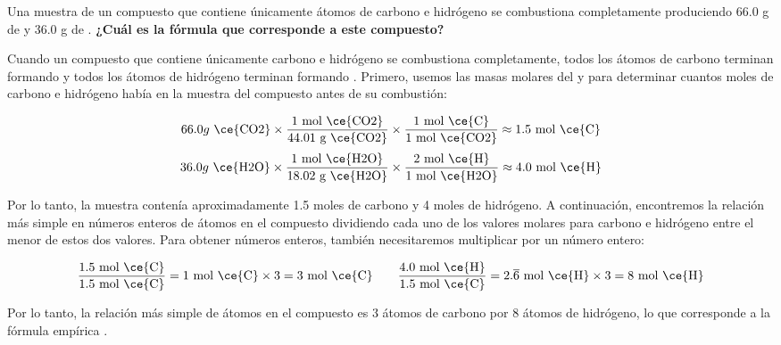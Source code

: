 Una muestra de un compuesto que contiene únicamente átomos de carbono e hidrógeno se combustiona completamente produciendo 66.0 g de  y 36.0 g de .
\textbf{¿Cuál es la fórmula que corresponde a este compuesto?}

\begin{oneparchoices}
    \choice  {}
    \CorrectChoice  {}
    \choice  {}
    \choice  {}
\end{oneparchoices}

\begin{solutionbox}{8.5cm}
    Cuando un compuesto que contiene únicamente carbono e hidrógeno se combustiona completamente, todos los átomos de carbono terminan formando  y todos los átomos de hidrógeno terminan formando .
    Primero, usemos las masas molares del  y  para determinar cuantos moles de carbono e hidrógeno había en la muestra del compuesto antes de su combustión:
    
    \[ 66.0 g \text{ \ce{CO2}} \times \frac{1 \text{ mol \ce{CO2}}}{44.01 \text{ g \ce{CO2}}} \times \dfrac{ 1 \text{ mol \ce{C}}}{1 \text{ mol \ce{CO2}}} \approx 1.5 \text{ mol \ce{C}}  \]
    \[ 36.0 g \text{ \ce{H2O}} \times \frac{1 \text{ mol \ce{H2O}}}{18.02 \text{ g \ce{H2O}}}  \times \dfrac{ 2 \text{ mol \ce{H}}}{1 \text{ mol \ce{H2O}}} \approx 4.0 \text{ mol \ce{H}}  \]
    
    Por lo tanto, la muestra contenía aproximadamente  1.5 moles de carbono y 4 moles de hidrógeno.
    A continuación, encontremos la relación más simple en números enteros de átomos en el compuesto dividiendo cada uno de los valores molares para carbono e hidrógeno entre el menor de estos dos valores. Para obtener números enteros, también necesitaremos multiplicar por un número entero:
    
    \[ \frac{1.5 \text{ mol \ce{C}}}{1.5 \text{ mol \ce{C}}} = 1 \text{ mol \ce{C}} \times 3 = 3 \text{ mol \ce{C}} \qquad \frac{4.0 \text{ mol \ce{H}}}{1.5 \text{ mol \ce{C}}} = 2.\overline{6} \text{ mol \ce{H}} \times 3 = 8 \text{ mol \ce{H}} \]
    
    Por lo tanto, la relación más simple de átomos en el compuesto es 3 átomos de carbono por 8 átomos de hidrógeno, lo que corresponde a la fórmula empírica .
\end{solutionbox}